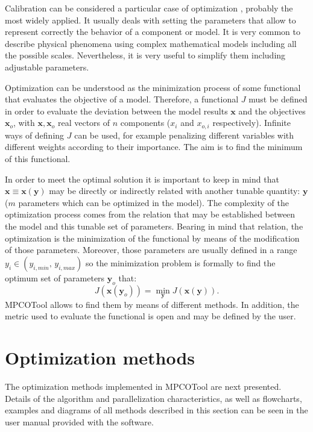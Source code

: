 \documentclass[review,authoryear]{elsarticle}
\newcommand{\EQ}[2]
{\begin{equation}#1\label{#2}\end{equation}}
\newcommand{\PA}[1]{\left(#1\right)}
\begin{document}
Calibration can be considered a particular case of optimization
\citep{WrightNocedal99}, probably the most widely applied. It usually deals with
setting the parameters that allow to represent correctly the behavior of a
component or model. It is very common to describe physical phenomena using
complex mathematical models including all the possible scales. Nevertheless, it
is very useful to simplify them including adjustable parameters.

Optimization can be understood as the minimization process of some functional
that evaluates the objective of a model. Therefore, a functional $J$ must be
defined in order to evaluate the deviation between the model results
$\mathbf{x}$ and the objectives $\mathbf{x}_o$, with
$\mathbf{x},\mathbf{x}_o$ real vectors of $n$
components ($x_i$ and $x_{o,i}$ respectively). 
Infinite ways of defining $J$ can be used, for example penalizing different
variables with different weights according to their importance.
The aim is to find the minimum of this functional.

In order to meet the optimal solution it is important to keep in mind that
$\mathbf{x}\equiv\mathbf{x}\PA{\mathbf{y}}$ may be directly or indirectly
related with another tunable quantity: $\mathbf{y}$  ($m$
parameters which can be optimized in the model). The complexity of the
optimization process comes from the relation that may be established between the
model and this tunable set of parameters. Bearing in mind that relation, the
optimization is the minimization of the functional by means of the modification
of those parameters. Moreover, those parameters are usually defined in a range
$y_i\in\PA{y_{i,min},\,y_{i,max}}$ so the minimization problem is formally
to find the optimum set of parameters $\mathbf{y}_o$ that:
\EQ
{
	J\PA{\mathbf{x}\PA{\mathbf{y}_o}}
	=\min_{\mathbf{y}}J\PA{\mathbf{x}\PA{\mathbf{y}}}.
}{EqParametersOptimal}
MPCOTool allows to find them by means of different methods. In addition,
the metric used to evaluate the functional is open and may be defined by the
user.

\section{Optimization methods}

The optimization methods implemented in MPCOTool are next presented.
Details of the algorithm and parallelization characteristics, as well as
flowcharts, examples and diagrams of all methods described in this section can
be seen in the user manual provided with the software.
\end{document}
